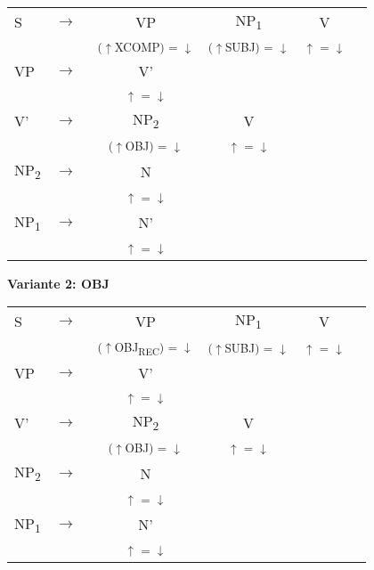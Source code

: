 \documentclass[12pt,a4paper]{article}
\begin{document}
\begin{singlespace}
\begin{tabular}{ l  l  c  c  c  c }
  S & $\rightarrow$ & VP & NP\textsubscript{1} & V\\
   & $\qquad$ & \textsuperscript{($\uparrow$XCOMP) = $\downarrow$} & \textsuperscript{($\uparrow$SUBJ) = $\downarrow$} & \textsuperscript{$\uparrow$ = $\downarrow$} \\
		    VP & $\rightarrow$ & V' \\
   & $\qquad$ & \textsuperscript{$\uparrow$ = $\downarrow$} \\
  				  V' & $\rightarrow$ & NP\textsubscript{2} & V \\
   & $\qquad$ & \textsuperscript{($\uparrow$OBJ) = $\downarrow$} & \textsuperscript{$\uparrow$ = $\downarrow$} \\
   					 NP\textsubscript{2} & $\rightarrow$ & N \\
   & $\qquad$ & \textsuperscript{$\uparrow$ = $\downarrow$} \\
    NP\textsubscript{1} & $\rightarrow$ & N' \\
   & $\qquad$ & \textsuperscript{$\uparrow$ = $\downarrow$} \\
\end{tabular} 
\end{singlespace}


\textbf{Variante 2: OBJ}

\begin{singlespace}
\begin{tabular}{ l  l  c  c  c  c }
  S & $\rightarrow$ & VP & NP\textsubscript{1} & V\\
   & $\qquad$ & \textsuperscript{($\uparrow$OBJ\textsubscript{REC}) = $\downarrow$} & \textsuperscript{($\uparrow$SUBJ) = $\downarrow$} & \textsuperscript{$\uparrow$ = $\downarrow$} \\
		    VP & $\rightarrow$ & V' \\
   & $\qquad$ & \textsuperscript{$\uparrow$ = $\downarrow$} \\
  				  V' & $\rightarrow$ & NP\textsubscript{2} & V \\
   & $\qquad$ & \textsuperscript{($\uparrow$OBJ) = $\downarrow$} & \textsuperscript{$\uparrow$ = $\downarrow$} \\
   					 NP\textsubscript{2} & $\rightarrow$ & N \\
   & $\qquad$ & \textsuperscript{$\uparrow$ = $\downarrow$} \\
    NP\textsubscript{1} & $\rightarrow$ & N' \\
   & $\qquad$ & \textsuperscript{$\uparrow$ = $\downarrow$} \\
\end{tabular} 
\end{singlespace}
\end{document}
